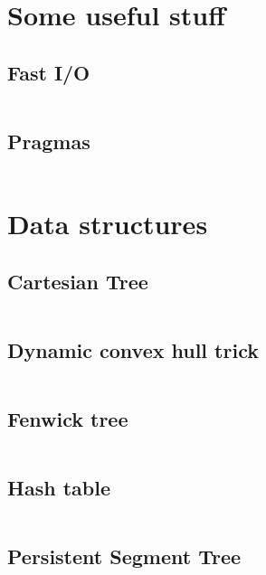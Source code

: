 \documentclass{article}
\begin{document}
\tableofcontents

\newpage

\section{Some useful stuff}
\subsection{Fast I/O}
\inputminted[mathescape, breaklines, breakafter=(, tabsize=2, frame=lines, showtabs, tab=|\ , tabcolor=lightgray]{c++}{./basic/fast-io/io.cpp}
\subsection{Pragmas}
\inputminted[mathescape, breaklines, breakafter=(, tabsize=2, frame=lines, showtabs, tab=|\ , tabcolor=lightgray]{c++}{./basic/pragmas/opt.cpp}
\section{Data structures}
\subsection{Cartesian Tree}
\inputminted[mathescape, breaklines, breakafter=(, tabsize=2, frame=lines, showtabs, tab=|\ , tabcolor=lightgray]{c++}{./data-structures/cartesian-tree/cartesian-tree.cpp}
\subsection{Dynamic convex hull trick}
\inputminted[mathescape, breaklines, breakafter=(, tabsize=2, frame=lines, showtabs, tab=|\ , tabcolor=lightgray]{c++}{./data-structures/convex-hull-trick/convex-hull-trick.cpp}
\subsection{Fenwick tree}
\inputminted[mathescape, breaklines, breakafter=(, tabsize=2, frame=lines, showtabs, tab=|\ , tabcolor=lightgray]{c++}{./data-structures/fenwick/fenwick.cpp}
\subsection{Hash table}
\inputminted[mathescape, breaklines, breakafter=(, tabsize=2, frame=lines, showtabs, tab=|\ , tabcolor=lightgray]{c++}{./data-structures/hash-table/hash-table.cpp}
\subsection{Persistent Segment Tree}
\inputminted[mathescape, breaklines, breakafter=(, tabsize=2, frame=lines, showtabs, tab=|\ , tabcolor=lightgray]{c++}{./data-structures/persistent-segment-tree/persistent-segment-tree..cpp}
\end{document}
